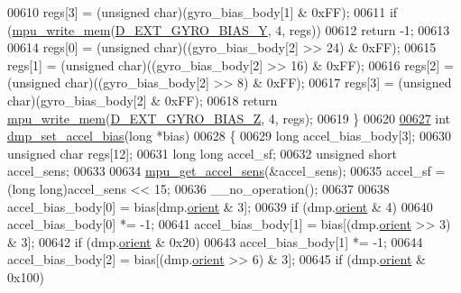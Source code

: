 \begin{DoxyCode}
00610     regs[3] = (\textcolor{keywordtype}{unsigned} char)(gyro\_bias\_body[1] & 0xFF);
00611     \textcolor{keywordflow}{if} (\hyperlink{group___d_r_i_v_e_r_s_gafea59910bc3dd30ba3356b1c75213a5f}{mpu\_write\_mem}(\hyperlink{group___d_r_i_v_e_r_s_ga6de6f7302f19c1f63f1a04b51ff14b1a}{D\_EXT\_GYRO\_BIAS\_Y}, 4, regs))
00612         \textcolor{keywordflow}{return} -1;
00613 
00614     regs[0] = (\textcolor{keywordtype}{unsigned} char)((gyro\_bias\_body[2] >> 24) & 0xFF);
00615     regs[1] = (\textcolor{keywordtype}{unsigned} char)((gyro\_bias\_body[2] >> 16) & 0xFF);
00616     regs[2] = (\textcolor{keywordtype}{unsigned} char)((gyro\_bias\_body[2] >> 8) & 0xFF);
00617     regs[3] = (\textcolor{keywordtype}{unsigned} char)(gyro\_bias\_body[2] & 0xFF);
00618     \textcolor{keywordflow}{return} \hyperlink{group___d_r_i_v_e_r_s_gafea59910bc3dd30ba3356b1c75213a5f}{mpu\_write\_mem}(\hyperlink{group___d_r_i_v_e_r_s_gacd6dead1c0b0458f1ec5d66914a1cf90}{D\_EXT\_GYRO\_BIAS\_Z}, 4, regs);
00619 \}
00620 
\hypertarget{inv__mpu__dmp__motion__driver_8c_source.tex_l00627}{}\hyperlink{group___d_r_i_v_e_r_s_gafbd714aee6086836f70aaea847771669}{00627} \textcolor{keywordtype}{int} \hyperlink{group___d_r_i_v_e_r_s_gafbd714aee6086836f70aaea847771669}{dmp\_set\_accel\_bias}(\textcolor{keywordtype}{long} *bias)
00628 \{
00629     \textcolor{keywordtype}{long} accel\_bias\_body[3];
00630     \textcolor{keywordtype}{unsigned} \textcolor{keywordtype}{char} regs[12];
00631     \textcolor{keywordtype}{long} \textcolor{keywordtype}{long} accel\_sf;
00632     \textcolor{keywordtype}{unsigned} \textcolor{keywordtype}{short} accel\_sens;
00633 
00634     \hyperlink{group___d_r_i_v_e_r_s_ga620408949052b96e856cad920f856583}{mpu\_get\_accel\_sens}(&accel\_sens);
00635     accel\_sf = (\textcolor{keywordtype}{long} long)accel\_sens << 15;
00636     \_\_no\_operation();
00637 
00638     accel\_bias\_body[0] = bias[dmp.\hyperlink{structdmp__s_ac949b11ebfe17c3a2ac42785a1437c25}{orient} & 3];
00639     \textcolor{keywordflow}{if} (dmp.\hyperlink{structdmp__s_ac949b11ebfe17c3a2ac42785a1437c25}{orient} & 4)
00640         accel\_bias\_body[0] *= -1;
00641     accel\_bias\_body[1] = bias[(dmp.\hyperlink{structdmp__s_ac949b11ebfe17c3a2ac42785a1437c25}{orient} >> 3) & 3];
00642     \textcolor{keywordflow}{if} (dmp.\hyperlink{structdmp__s_ac949b11ebfe17c3a2ac42785a1437c25}{orient} & 0x20)
00643         accel\_bias\_body[1] *= -1;
00644     accel\_bias\_body[2] = bias[(dmp.\hyperlink{structdmp__s_ac949b11ebfe17c3a2ac42785a1437c25}{orient} >> 6) & 3];
00645     \textcolor{keywordflow}{if} (dmp.\hyperlink{structdmp__s_ac949b11ebfe17c3a2ac42785a1437c25}{orient} & 0x100)

\end{DoxyCode}
